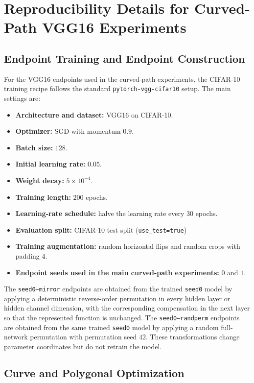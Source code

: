 \documentclass[11pt,a4paper]{report}
\begin{document}
\section{Reproducibility Details for Curved-Path VGG16 Experiments}
\label{app:curved_path_repro}

\subsection{Endpoint Training and Endpoint Construction}

For the VGG16 endpoints used in the curved-path experiments, the CIFAR-10 training recipe follows the standard \texttt{pytorch-vgg-cifar10} setup. The main settings are:
\begin{itemize}
    \item \textbf{Architecture and dataset:} VGG16 on CIFAR-10.
    \item \textbf{Optimizer:} SGD with momentum \(0.9\).
    \item \textbf{Batch size:} \(128\).
    \item \textbf{Initial learning rate:} \(0.05\).
    \item \textbf{Weight decay:} \(5\times 10^{-4}\).
    \item \textbf{Training length:} \(200\) epochs.
    \item \textbf{Learning-rate schedule:} halve the learning rate every \(30\) epochs.
    \item \textbf{Evaluation split:} CIFAR-10 test split (\texttt{use\_test=true})
    \item \textbf{Training augmentation:} random horizontal flips and random crops with padding \(4\).
    \item \textbf{Endpoint seeds used in the main curved-path experiments:} \(0\) and \(1\).
\end{itemize}

The \texttt{seed0--mirror} endpoints are obtained from the trained \texttt{seed0} model by applying a deterministic reverse-order permutation in every hidden layer or hidden channel dimension, with the corresponding compensation in the next layer so that the represented function is unchanged. The \texttt{seed0--randperm} endpoints are obtained from the same trained \texttt{seed0} model by applying a random full-network permutation with permutation seed \(42\). These transformations change parameter coordinates but do not retrain the model.

\subsection{Curve and Polygonal Optimization}
\label{app:affine}
\end{document}
